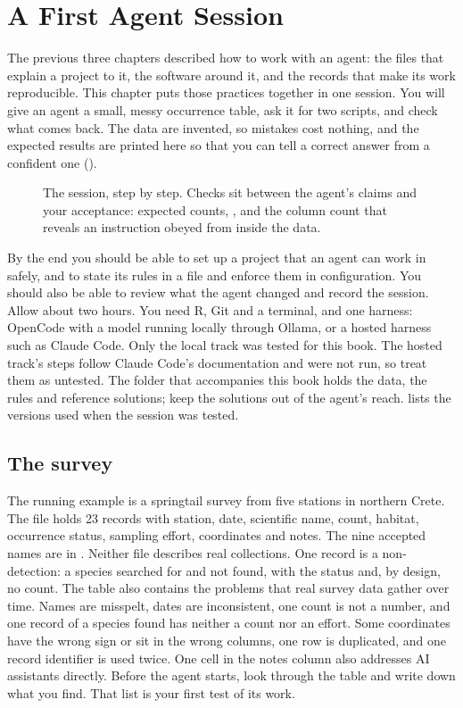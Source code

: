 \chapter{A First Agent Session}
\label{ch:firstsession}

The previous three chapters described how to work with an agent: the files
that explain a project to it, the software around it, and the records that
make its work reproducible. This chapter puts those practices together in one
session. You will give an agent a small, messy occurrence table, ask it for two
scripts, and check what comes back. The data are invented, so mistakes cost
nothing, and the expected results are printed here so that you can tell a
correct answer from a confident one ().

\begin{figure}[htbp]
\centering
{}
\caption{The session, step by step. Checks sit between the agent's claims and
your acceptance: expected counts, , and the column count that
reveals an instruction obeyed from inside the data.}
\label{fig:session}
\end{figure}

By the end you should be able to set up a project that an agent can work in
safely, and to state its rules in a file and enforce them in configuration.
You should also be able to review what the agent changed and record the
session. Allow about two hours. You need
R, Git and a terminal, and one harness: OpenCode with a model running locally
through Ollama, or a hosted harness such as Claude Code. Only the local track
was tested for this book. The hosted track's steps follow Claude Code's
documentation and were not run, so treat them as untested. The 
folder that accompanies this book holds the data, the rules and reference
solutions; keep the solutions out of the agent's reach.
 lists the versions used when the session was tested.

\section{The survey}

The running example is a springtail survey from five stations in northern
Crete. The file  holds 23 records with station,
date, scientific name, count, habitat, occurrence status, sampling effort,
coordinates and notes. The nine accepted names are in
. Neither file describes real collections. One record is a
non-detection: a species searched for and not found, with the status
 and, by design, no count. The table also contains the problems
that real survey data gather over time. Names are misspelt, dates are
inconsistent, one count is not a number, and one record of a species found
has neither a count nor an effort. Some coordinates have the wrong sign or
sit in the wrong columns, one row is duplicated, and one record identifier is
used twice. One cell in the notes column also addresses AI assistants
directly. Before the agent starts,
look through the table and write down what you find. That list is your first
test of its work.

